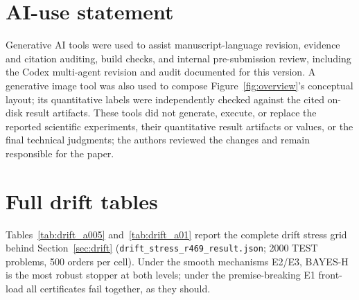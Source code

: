 \documentclass{article}
\theoremstyle{definition}
\theoremstyle{remark}
\begin{document}
\section*{AI-use statement}
Generative AI tools were used to assist manuscript-language revision,
evidence and citation auditing, build checks, and internal pre-submission
review, including the Codex multi-agent revision and audit documented for this
version. A generative image tool was also used to compose Figure~\ref{fig:overview}'s
conceptual layout; its quantitative labels were independently checked against
the cited on-disk result artifacts. These tools did not generate, execute, or
replace the reported scientific experiments, their quantitative result
artifacts or values, or the final technical judgments; the authors reviewed
the changes and remain responsible for the paper.




\appendix




\section{Full drift tables}
\label{app:drift}
Tables~\ref{tab:drift_a005} and~\ref{tab:drift_a01} report the complete
drift stress grid behind Section~\ref{sec:drift}
(\texttt{drift\_stress\_r469\_result.json}; 2000 TEST problems, 500
orders per cell). Under the smooth mechanisms E2/E3, BAYES-H is the most
robust stopper at both levels; under the premise-breaking E1 front-load
all certificates fail together, as they should.

\end{document}
